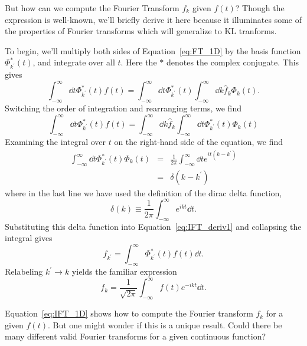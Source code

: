 But how can we compute the Fourier Transform $f_k$ given $f(t)$?  Though
the expression is well-known, we'll briefly derive it here because it
illuminates some of the properties of Fourier transforms which will
generalize to KL tranforms.

To begin, we'll multiply both sides of Equation~\ref{eq:FT_1D} by the
basis function $\Phi^*_{k^\prime}(t)$, and integrate over all $t$.
Here the $\ast$ denotes the complex conjugate.  This gives
\begin{equation}
  \label{eq:FT_1D}
  \int_{-\infty}^\infty \dd t \Phi^\ast_{k^\prime}(t) f(t)
  = \int_{-\infty}^\infty \dd t \Phi^\ast_{k^\prime}(t)
  \int_{-\infty}^\infty \dd k \hat{f}_k \Phi_k(t).
\end{equation}
Switching the order of integration and rearranging terms, we find
\begin{equation}
  \label{eq:IFT_deriv1}
  \int_{-\infty}^\infty \dd t \Phi^\ast_{k^\prime}(t) f(t)
  = \int_{-\infty}^\infty \dd k \hat{f}_k
  \int_{-\infty}^\infty \dd t \Phi^\ast_{k^\prime}(t)\Phi_k(t)
\end{equation}
Examining the integral over $t$ on the right-hand side of the equation,
we find
\begin{eqnarray}
  \int_{-\infty}^\infty \dd t \Phi^\ast_{k^\prime}(t)\Phi_k(t)
  &=& \frac{1}{2\pi} \int_{-\infty}^\infty
  \dd t e^{i t (k - k^\prime)}\nonumber\\
  &=& \delta(k - k^\prime)
\end{eqnarray}
where in the last line we have used the definition of the dirac delta
function,
\begin{equation}
  \delta(k) \equiv \frac{1}{2\pi} \int_{-\infty}^\infty e^{ikt} \dd t.
\end{equation}
Substituting this delta function into Equation~\ref{eq:IFT_deriv1}
and collapsing the integral gives
\begin{equation}
  f_{k^\prime} = \int_{-\infty}^\infty \Phi^\ast_{k^\prime}(t) f(t) \dd t.
\end{equation}
Relabeling $k^\prime \to k$ yields the familiar expression
\begin{equation}
  \label{eq:IFT_1D}
  f_k = \frac{1}{\sqrt{2\pi}}\int_{-\infty}^\infty f(t) e^{-ikt} \dd t.
\end{equation}

Equation~\ref{eq:IFT_1D} shows how to compute the Fourier transform
$f_k$ for a given $f(t)$.  But one might wonder if this is a unique
result.  Could there be many different valid Fourier transforms for a given
continuous function?

